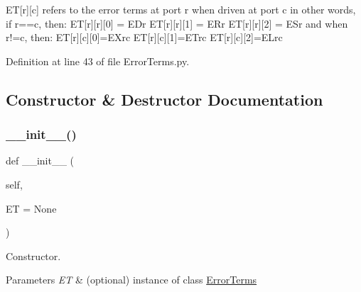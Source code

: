 ET\mbox{[}r\mbox{]}\mbox{[}c\mbox{]} refers to the error terms at port r when driven at port c in other words, if r==c, then\+: ET\mbox{[}r\mbox{]}\mbox{[}r\mbox{]}\mbox{[}0\mbox{]} = E\+Dr ET\mbox{[}r\mbox{]}\mbox{[}r\mbox{]}\mbox{[}1\mbox{]} = E\+Rr ET\mbox{[}r\mbox{]}\mbox{[}r\mbox{]}\mbox{[}2\mbox{]} = E\+Sr and when r!=c, then\+: ET\mbox{[}r\mbox{]}\mbox{[}c\mbox{]}\mbox{[}0\mbox{]}=E\+Xrc ET\mbox{[}r\mbox{]}\mbox{[}c\mbox{]}\mbox{[}1\mbox{]}=E\+Trc ET\mbox{[}r\mbox{]}\mbox{[}c\mbox{]}\mbox{[}2\mbox{]}=E\+Lrc 

Definition at line 43 of file Error\+Terms.\+py.



\subsection{Constructor \& Destructor Documentation}
\mbox{\label{classSignalIntegrity_1_1Measurement_1_1Calibration_1_1ErrorTerms_1_1ErrorTerms_ad8cdadc2d29a11c5f69d487c0bf1a7a3}} 
\subsubsection{\texorpdfstring{\+\_\+\+\_\+init\+\_\+\+\_\+()}{\_\_init\_\_()}}
{\footnotesize\ttfamily def \+\_\+\+\_\+init\+\_\+\+\_\+ (\begin{DoxyParamCaption}\item[{}]{self,  }\item[{}]{ET = {\ttfamily None} }\end{DoxyParamCaption})}



Constructor. 


\begin{DoxyParams}{Parameters}
{\em ET} & (optional) instance of class \hyperlink{classSignalIntegrity_1_1Measurement_1_1Calibration_1_1ErrorTerms_1_1ErrorTerms}{Error\+Terms} \\
\hline
\end{DoxyParams}


